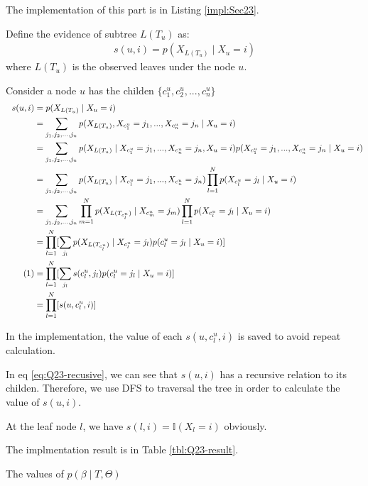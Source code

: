 \documentclass[12pt]{article}
\newcommand\numberthis{\addtocounter{equation}{1}\tag{\theequation}}
\newenvironment{problem}[2][Problem]{\begin{trivlist}
\item[\hskip \labelsep {\bfseries #1}\hskip \labelsep {\bfseries #2.}]}{\end{trivlist}}
\begin{document}
\begin{problem}{2.3.10}
The implementation of this part is in Listing \ref{impl:Sec23}.

Define the evidence of subtree $L(T_u)$ as:
\begin{align*}
    s(u, i) = p(X_{L(T_u)} \mid X_u = i)
\end{align*}
where $L(T_u)$ is the observed leaves under the node $u$.

Consider a node $u$ has the childen $\{ c^{u}_1, c^{u}_2, ..., c^{u}_n\}$
\begin{align*}
    s(u, i) &= p(X_{L(T_u)} \mid X_u = i) \\
    &= \sum_{j_1, j_2, ...,j_n} p(X_{L(T_u)}, X_{c^{u}_1} = j_1, ..., X_{c^{u}_n}=j_n \mid X_u = i) \\
    &= \sum_{j_1, j_2, ...,j_n} 
        p(X_{L(T_u)} \mid X_{c^{u}_1} = j_1, ..., X_{c^{u}_n}=j_n, X_u = i)
        p(X_{c^{u}_1} = j_1, ..., X_{c^{u}_n}=j_n \mid X_u = i) \\
    &= \sum_{j_1, j_2, ...,j_n} 
        p(X_{L(T_u)} \mid X_{c^{u}_1} = j_1, ..., X_{c^{u}_n}=j_n)
        \prod_{l=1}^{N}p(X_{c^{u}_l} = j_l \mid X_u = i) \\
    &= \sum_{j_1, j_2, ...,j_n} 
        \prod_{m=1}^{N}p(X_{L(T_{c^{u}_l})}\mid X_{c^{u}_m} = j_m)
        \prod_{l=1}^{N}p(X_{c^{u}_l} = j_l \mid X_u = i) \\
    &= \prod_{l=1}^{N} [
        \sum_{j_l}p(X_{L(T_{c^{u}_l})}\mid X_{c^{u}_l} = j_l)p(c^{u}_l = j_l \mid X_u = i)] \\ 
        \numberthis \label{eq:Q23-recusive}
    &= \prod_{l=1}^{N} [
        \sum_{j_l}s(c^{u}_l, j_l)p(c^{u}_l = j_l \mid X_u = i)]  \\
    &= \prod_{l=1}^{N} [s(u, c^{u}_l, i)]
\end{align*}

In the implementation, the value of each $s(u, c^{u}_l, i)$ is saved to avoid repeat
calculation.

In eq \eqref{eq:Q23-recusive}, we can see that $s(u, i)$ has a recursive relation
to its childen. Therefore, we use DFS to traversal the tree in order to calculate
the value of $s(u, i)$.

At the leaf node $l$, we have $s(l, i) = \mathbb{I}(X_l = i)$ obviously.
\end{problem}

\begin{problem}{2.3.11}
The implmentation result is in Table \ref{tbl:Q23-result}.
\begin{table}
    \centering
    \caption{The values of $p(\beta \mid T, \Theta)$}\label{tbl:Q23-result}
\end{table} 
\end{problem}
\pagebreak
\end{document}
